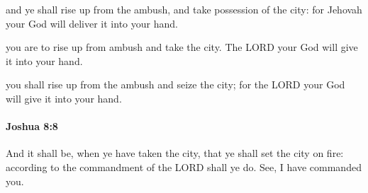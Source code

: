 			\begin{versebox}
					\item[BHS] 
					\item[ASV] and ye shall rise up from the ambush, and take possession of the city: for Jehovah your God will deliver it into your hand.
					\item[NIV] you are to rise up from ambush and take the city. The LORD your God will give it into your hand.
					\item[NRSV] you shall rise up from the ambush and seize the city; for the LORD your God will give it into your hand.
			\end{versebox}

		\paragraph{Joshua 8:8} %
			\label{JOSHUA-8-8}

			And it shall be, when ye have taken the city, that ye shall set the city on fire: according to the commandment of the LORD shall ye do. See, I have commanded you.

